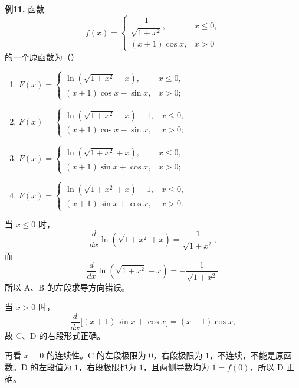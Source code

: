 \begin{problemblock}
\textbf{例11.} 函数
\[
f(x)=\begin{cases}
\dfrac1{\sqrt{1+x^2}},&x\le0,\\
(x+1)\cos x,&x>0
\end{cases}
\]
的一个原函数为（\quad）
\begin{enumerate}[label=\Alph*., leftmargin=2.2em]
\item \(\displaystyle F(x)=\begin{cases}
\ln(\sqrt{1+x^2}-x),&x\le0,\\
(x+1)\cos x-\sin x,&x>0;
\end{cases}\)
\item \(\displaystyle F(x)=\begin{cases}
\ln(\sqrt{1+x^2}-x)+1,&x\le0,\\
(x+1)\cos x-\sin x,&x>0;
\end{cases}\)
\item \(\displaystyle F(x)=\begin{cases}
\ln(\sqrt{1+x^2}+x),&x\le0,\\
(x+1)\sin x+\cos x,&x>0;
\end{cases}\)
\item \(\displaystyle F(x)=\begin{cases}
\ln(\sqrt{1+x^2}+x)+1,&x\le0,\\
(x+1)\sin x+\cos x,&x>0.
\end{cases}\)
\end{enumerate}
\end{problemblock}
\begin{solutionblock}
当 \(x\le0\) 时，
\[
\frac{d}{dx}\ln(\sqrt{1+x^2}+x)=\frac1{\sqrt{1+x^2}},
\]
而
\[
\frac{d}{dx}\ln(\sqrt{1+x^2}-x)=-\frac1{\sqrt{1+x^2}}.
\]
所以 A、B 的左段求导方向错误。

当 \(x>0\) 时，
\[
\frac{d}{dx}\bigl[(x+1)\sin x+\cos x\bigr]=(x+1)\cos x,
\]
故 C、D 的右段形式正确。

再看 \(x=0\) 的连续性。C 的左段极限为 \(0\)，右段极限为 \(1\)，不连续，不能是原函数。D 的左段值为 \(1\)，右段极限也为 \(1\)，且两侧导数均为 \(1=f(0)\)，所以 D 正确。
\end{solutionblock}

